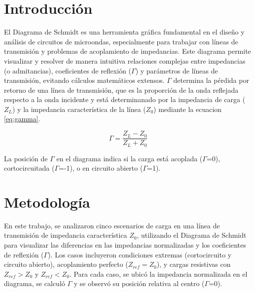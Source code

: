 \documentclass{article}   %
\theoremstyle{mytheoremstyle}
\theoremstyle{mytheoremstyle}
\theoremstyle{myproblemstyle}
\begin{document}
    \noindent\begin{minipage}{0.49\textwidth}   %
        {\centering\section*{\large Introducción}}

        El Diagrama de Schmidt es una herramienta gráfica fundamental en el diseño y análisis de circuitos de microondas, 
        especialmente para trabajar con líneas de transmisión y problemas de acoplamiento de impedancias. Este diagrama permite 
        visualizar y resolver de manera intuitiva relaciones complejas entre impedancias (o admitancias), coeficientes de 
        reflexión ($\Gamma$) y parámetros de líneas de transmisión, evitando cálculos matemáticos extensos. $\Gamma$ determina
        la pérdida por retorno de una línea de transmisión, que es la proporción de la onda reflejada respecto a la onda
        incidente y está determinanado por la impedancia de carga ($Z_L$) y la impedancia característica de la línea ($Z_0$) 
        mediante la ecuacion \eqref{eq:gamma}.

        \begin{equation}
            \Gamma = \frac{Z_L-Z_0}{Z_L+Z_0}
            \label{eq:gamma}
        \end{equation}
        
        La posición de $\Gamma$ en el diagrama indica si la carga está acoplada ($\Gamma$=0), cortocircuitada ($\Gamma$=-1),
        o en circuito abierto ($\Gamma$=1).

        {\centering\section*{\large Metodología}}

        En este trabajo, se analizaron cinco escenarios de carga en una línea de transmisión de impedancia característica $Z_0$,
         utilizando el Diagrama de Schmidt para visualizar las diferencias en las impedancias normalizadas y los
          coeficientes de reflexión ($\Gamma$). Los casos incluyeron condiciones extremas (cortocircuito y circuito abierto), 
          acoplamiento perfecto ($Z_{ref} = Z_{0}$), y cargas resistivas con $Z_{ref} > Z_{0}$ y $Z_{ref} < Z_{0}$. Para cada 
          caso, se ubicó la impedancia normalizada en el diagrama, se calculó $\Gamma$ y se observó su posición relativa al 
          centro ($\Gamma$=0).


\end{minipage}
\end{document}
